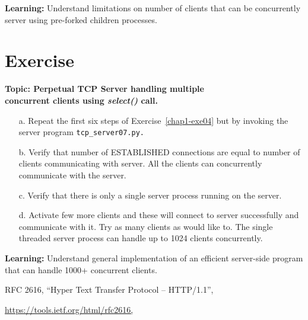 \begin{multicols}{2}
\vspace{-.3cm}

\textbf{Learning:} Understand limitations on number of clients that can be concurrently server using pre-forked children processes.

\vspace{-.3cm}

\section*{Exercise \label{chap1-exe05}}

\textbf{Topic: Perpetual TCP Server handling multiple\\ concurrent clients using \textit{select()} call.}

\vspace{-.3cm}

\begin{itemize}

\item[a.] Repeat the first six steps of Exercise~\ref{chap1-exe04} but by invoking the server program \texttt{tcp\_server07.py.}

\item[b.] Verify that number of ESTABLISHED connections are equal to number of clients communicating with server. All the clients can concurrently communicate with the server.

\item[c.] Verify that there is only a single server process running on the server.

\item[d.] Activate few more clients and these will connect to server successfully and communicate with it. Try as many clients as would like to. The single threaded server process can handle up to 1024 clients concurrently.

\end{itemize}

\vspace{-.3cm}

\textbf{Learning:}  Understand general implementation of an efficient server-side program that can handle 1000+ concurrent clients.

\vspace{-.3cm}

\begin{thebibliography}{99}
 RFC 2616, “Hyper Text Transfer Protocol – HTTP/1.1”,

\url{https://tools.ietf.org/html/rfc2616,}


\end{thebibliography}
\end{multicols}

